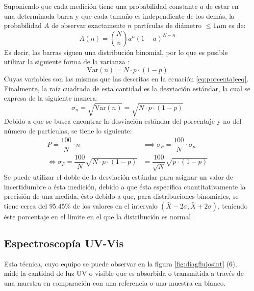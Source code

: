 \documentclass[../main.tex]{subfiles}
\begin{document}
Suponiendo que cada medición tiene una probabilidad constante $a$ de estar en una determinada barra y que cada tamaño es independiente de los demás, la probabilidad $A$ de observar exactamente $n$ partículas de diámetro $\leq 1\mu$m es de:
\begin{equation}
    A(n)=\binom{N}{n}a^n(1-a)^{N-n}
    \label{eq:binomdist}
\end{equation}
Es decir, las barras siguen una distribución binomial, por lo que es posible utilizar la siguiente forma de la varianza \cite{Stephenson2005}:
\begin{equation}
    \text{Var}(n)=N\cdot p\cdot(1-p)
    \label{eq:varianza}
\end{equation}
Cuyas variables son las mismas que las descritas en la ecuación \ref{eq:porcentajeeq}. Finalmente, la raíz cuadrada de esta cantidad es la desviación estándar, la cual se expresa de la siguiente manera:
\begin{equation}
    \sigma_n=\sqrt{\text{Var}(n)}=\sqrt{N\cdot p\cdot(1-p)}
    \label{eq:desviacionsinescalar}
\end{equation}
Debido a que se busca encontrar la desviación estándar del porcentaje y no del número de partículas, se tiene lo siguiente:
\begin{equation}
    \begin{split}
        P=\dfrac{100}{N}\cdot n&\implies\sigma_P=\dfrac{100}{N}\cdot\sigma_n\\
        \iff \sigma_P=\dfrac{100}{N}\sqrt{N\cdot p\cdot(1-p)}&=\dfrac{100}{\sqrt{N}}\sqrt{p\cdot(1-p)}
    \end{split}
    \label{eq:desvest}
\end{equation}
Se puede utilizar el doble de la desviación estándar para asignar un valor de incertidumbre a ésta medición, debido a que ésta especifica cuantitativamente la precisión de una medida, ésto debido a que, para distribuciones binomiales, se tiene cerca del 95.45\% de los valores en el intervalo $(\bar{X}-2\sigma,\bar{X}+2\sigma)$, teniendo éste porcentaje en el límite en el que la distribución es normal \cite{bertaoda}.
\subsection{Espectroscopía UV-Vis}\label{sec:uvvismetod}
Esta técnica, cuyo equipo se puede observar en la figura \ref{fig:diagflujosint} (6), mide la cantidad de luz UV o visible que es absorbida o transmitida a través de una muestra en comparación con una referencia o una muestra en blanco.
\end{document}
